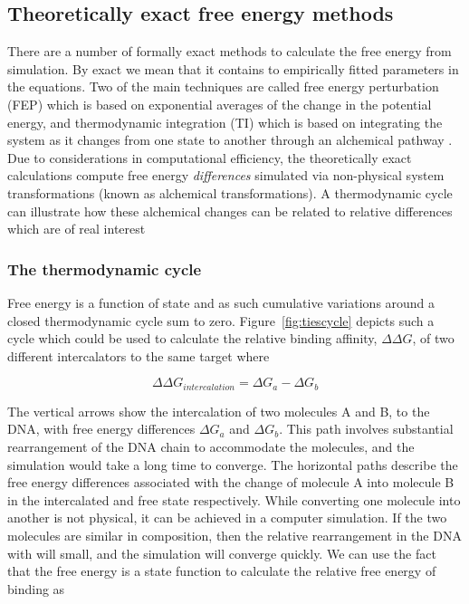 \documentclass[11pt, a4paper]{report}
\begin{document}
\subsection{Theoretically exact free energy methods}

There are a number of formally exact methods to calculate the free energy from simulation. By exact we mean that it contains to empirically fitted parameters in the equations. Two of the main techniques are called free energy perturbation (FEP) which is based on exponential averages of the change in the potential energy, and thermodynamic integration (TI) which is based on integrating the system as it changes from one state to another through an alchemical pathway \cite{chipot2007free, deng2009computations}. Due to considerations in computational efficiency, the theoretically exact calculations compute free energy \emph{differences} simulated via non-physical system transformations (known as alchemical transformations). A thermodynamic cycle can illustrate how these alchemical changes can be related to relative differences which are of real interest

\subsubsection{The thermodynamic cycle}

Free energy is a function of state and as such cumulative variations around a closed thermodynamic cycle sum to zero. Figure~\ref{fig:tiescycle} depicts such a cycle which could be used to calculate the relative binding affinity, $\Delta \Delta G$, of two different intercalators to the same target where

\begin{equation}
  \Delta \Delta G_{intercalation} = \Delta G_{a} - \Delta G_{b} 
\end{equation}

The vertical arrows show the intercalation of two molecules A and B, to the DNA, with free energy differences $\Delta G_{a}$ and $\Delta G_{b}$. This path involves substantial rearrangement of the DNA chain to accommodate the molecules, and the simulation would take a long time to converge. The horizontal paths describe the free energy differences associated with the change of molecule A into molecule B in the intercalated and free state respectively. While converting one molecule into another is not physical, it can be achieved in a computer simulation. If the two molecules are similar in composition, then the relative rearrangement in the DNA with will small, and the simulation will converge quickly. We can use the fact that the free energy is a state function to calculate the relative free energy of binding as
\end{document}

